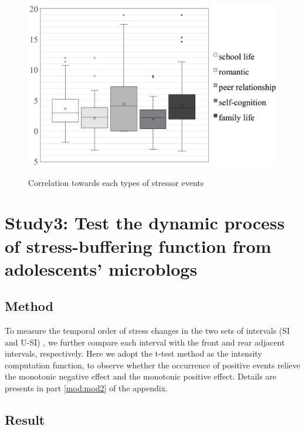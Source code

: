 \begin{figure}[H]
\centering
\caption{Correlation towards each types of stressor events}
\includegraphics[width=0.85\linewidth]{figs/box3.eps}%
\label{fig:correlation}
\end{figure}

\section{Study3: Test the dynamic process of stress-buffering function from adolescents' microblogs}
\subsection{Method}
\label{sec:temporal}
To measure the temporal order of stress changes in the two sets of intervals (SI and U-SI) ,
we further compare each interval with the front and rear adjacent intervals, respectively.
Here we adopt the t-test method as the intensity computation function,
to observe whether the occurrence of positive events relieve the monotonic negative effect and the monotonic positive effect.
Details are presents in part \ref{mod:mod2} of the appendix.

\subsection{Result}
